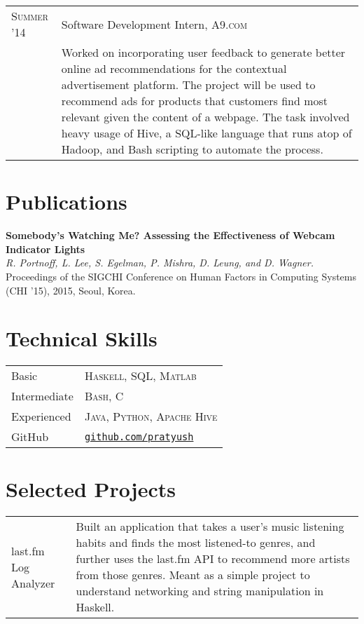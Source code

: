 \documentclass[letter,10pt]{article}
\begin{document}
\begin{tabular}{R{2.5cm}p{13cm}}
  \textsc{Summer '14}     & Software Development Intern, \textsc{A9.com}\\

                          &\footnotesize{
                             Worked on incorporating user feedback to generate
                             better online ad recommendations for the
                             contextual advertisement platform. The project
                             will be used to recommend ads for products that
                             customers find most relevant given the content of
                             a webpage. The task involved heavy usage of Hive,
                             a SQL-like language that runs atop of Hadoop, and
                             Bash scripting to automate the process.
                            }
\end{tabular}

\section{Publications}
\textbf{Somebody's Watching Me? Assessing the Effectiveness of Webcam Indicator Lights}\\
\textit{R. Portnoff, L. Lee, S. Egelman, P. Mishra, D. Leung, and D. Wagner.}
Proceedings of the SIGCHI Conference on Human Factors in Computing Systems (CHI
’15), 2015, Seoul, Korea.


\section{Technical Skills}
\begin{tabular}{R{2.5cm}l}
  Basic         & \textsc{Haskell}, \textsc{SQL}, \textsc{Matlab}\\
  Intermediate  & \textsc{Bash, C}\\
  Experienced   & \textsc{Java, Python, Apache Hive}\\
  GitHub        & \href{https://www.github.com/pratyush}{\texttt{github.com/pratyush}}
\end{tabular}

\section{Selected Projects}
\begin{tabular}{R{2.5cm}p{11cm}}
  last.fm Log Analyzer &   Built an application that takes a user’s music
                           listening habits and finds the most listened-to
                           genres, and further uses the last.fm API to
                           recommend more artists from those genres. Meant as a
                           simple project to understand networking and string
                           manipulation in Haskell. \\
\end{tabular}
\end{document}

